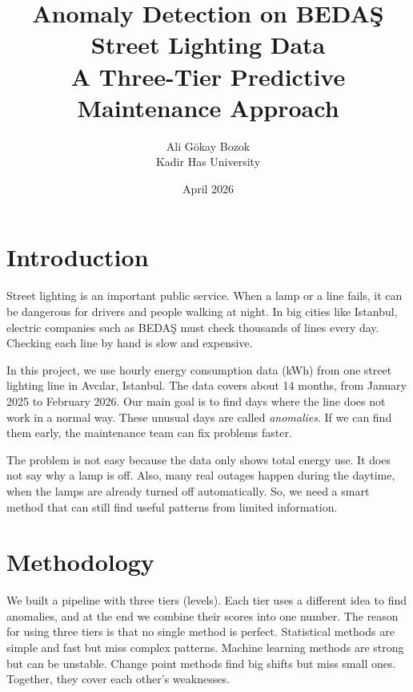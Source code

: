 \documentclass[11pt,a4paper]{article}
\title{Anomaly Detection on BEDAŞ Street Lighting Data \\ \large A Three-Tier Predictive Maintenance Approach}
\author{Ali Gökay Bozok \\ Kadir Has University}
\date{April 2026}
\begin{document}
\maketitle

\section{Introduction}

Street lighting is an important public service. When a lamp or a line fails, it can be dangerous for drivers and people walking at night. In big cities like Istanbul, electric companies such as BEDAŞ must check thousands of lines every day. Checking each line by hand is slow and expensive.

In this project, we use hourly energy consumption data (kWh) from one street lighting line in Avcılar, Istanbul. The data covers about 14 months, from January 2025 to February 2026. Our main goal is to find days where the line does not work in a normal way. These unusual days are called \textit{anomalies}. If we can find them early, the maintenance team can fix problems faster.

The problem is not easy because the data only shows total energy use. It does not say why a lamp is off. Also, many real outages happen during the daytime, when the lamps are already turned off automatically. So, we need a smart method that can still find useful patterns from limited information.

\section{Methodology}

We built a pipeline with three tiers (levels). Each tier uses a different idea to find anomalies, and at the end we combine their scores into one number. The reason for using three tiers is that no single method is perfect. Statistical methods are simple and fast but miss complex patterns. Machine learning methods are strong but can be unstable. Change point methods find big shifts but miss small ones. Together, they cover each other's weaknesses.
\end{document}
